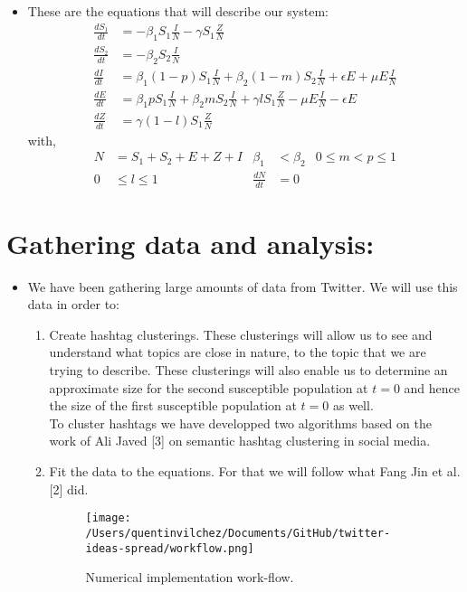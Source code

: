 \documentclass{article}
\begin{document}
\begin{itemize}
\item These are the equations that will describe our system:
\begin{equation} 
\begin{split}
\frac{dS_1}{dt} &= -{\beta}_1 S_1\frac{I}{N} -\gamma S_1\frac{Z}{N}\\
\frac{dS_2}{dt} &= -{\beta}_2 S_2\frac{I}{N}\\
\frac{dI}{dt} &= {\beta}_1 (1-p)S_1\frac{I}{N} + {\beta}_2 (1-m)S_2\frac{I}{N} + \epsilon E + \mu E\frac{I}{N}\\
\frac{dE}{dt} &= {\beta}_1 pS_1\frac{I}{N} + {\beta}_2 mS_2\frac{I}{N} + \gamma       lS_1\frac{Z}{N} - \mu E\frac{I}{N} - \epsilon E\\
\frac{dZ}{dt} &=  \gamma (1-l)S_1\frac{Z}{N}
\end{split}
\end{equation}
with,
\begin{align*}
 N& = S_1 + S_2 + E + Z + I & {\beta}_1 &< {\beta}_2  & 0\leq m<p\leq 1\\
0&\leq l \leq 1  & \frac{dN}{dt}&=0
\end{align*}
\end{itemize}
\section{Gathering data and analysis:}
\begin{itemize}
\item We have been gathering large amounts of data from Twitter. We will use this data in order to:
\begin{enumerate}
\item Create hashtag clusterings. These clusterings will allow us to see and understand what topics are close in nature, to the topic that we are trying to describe. These clusterings will also enable us to determine an approximate size for the second susceptible population at $t=0$ and hence the size of the first susceptible population at $t=0$ as well.
\\To cluster hashtags we have developped two algorithms based on the work of Ali Javed [3] on semantic hashtag clustering in social media. 
\item Fit the data to the equations. For that we will follow what Fang Jin et al. [2] did. 
\begin{figure}[h]

\centering
\texttt{[image: /Users/quentinvilchez/Documents/GitHub/twitter-ideas-spread/workflow.png]}
\caption{Numerical implementation work-flow.}
\end{figure}
\end{enumerate}

\end{itemize}
\end{document}

